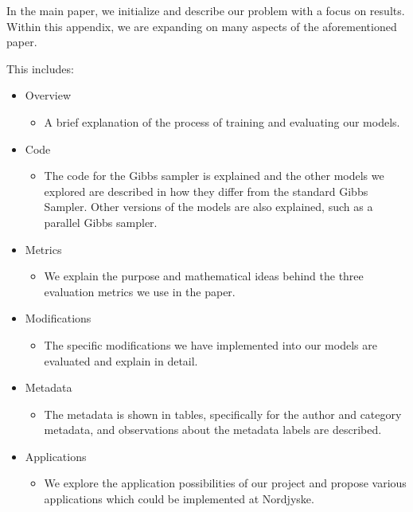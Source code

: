 In the main paper, we initialize and describe our problem with a focus on results.
Within this appendix, we are expanding on many aspects of the aforementioned paper.

This includes:
\begin{itemize}
	\item Overview
	\begin{itemize}
		\item A brief explanation of the process of training and evaluating our models.
	\end{itemize}
	\item Code
	\begin{itemize}
		\item The code for the Gibbs sampler is explained and the other models we explored are described in how they differ from the standard Gibbs Sampler. 
		Other versions of the models are also explained, such as a parallel Gibbs sampler.
	\end{itemize}
	\item Metrics 
	\begin{itemize}
		\item We explain the purpose and mathematical ideas behind the three evaluation metrics we use in the paper.
	\end{itemize}
	\item Modifications 
	\begin{itemize}
		\item The specific modifications we have implemented into our models are evaluated and explain in detail.
	\end{itemize}
	\item Metadata
	\begin{itemize}
		\item The metadata is shown in tables, specifically for the author and category metadata, and observations about the metadata labels are described.
	\end{itemize}
	\item Applications
	\begin{itemize}
		\item We explore the application possibilities of our project and propose various applications which could be implemented at Nordjyske.
	\end{itemize}
\end{itemize}
